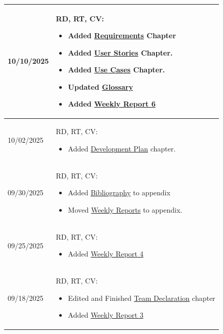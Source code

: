 \begin{longtable}{|l||p{13.5cm}|}
10/10/2025 & RD, RT, CV:
\begin{itemize}[topsep=0pt,itemsep=0pt,parsep=0pt,partopsep=0pt,leftmargin=12pt]
    \item Added \hyperref[Chapter::Requirements]{Requirements} Chapter
    \item Added \hyperref[Chapter::UserStories]{User Stories} Chapter.
    \item Added \hyperref[Chapter::UseCases]{Use Cases} Chapter.
    \item Updated \hyperref[Chapter::Glossary]{Glossary}
    \item Added \hyperref[sec:report6]{Weekly Report 6}
\end{itemize}
\\ \hline

10/02/2025 & RD, RT, CV:
\begin{itemize}[topsep=0pt,itemsep=0pt,parsep=0pt,partopsep=0pt,leftmargin=12pt]
    \item Added \hyperref[Chapter::DevelopmentPlan]{Development Plan} chapter.
\end{itemize}
\\ \hline

09/30/2025 & RD, RT, CV:
\begin{itemize}[topsep=0pt,itemsep=0pt,parsep=0pt,partopsep=0pt,leftmargin=12pt]
    \item Added \hyperref[sec:bibliography]{Bibliography} to appendix
    \item Moved \hyperref[Chapter::WeeklyReports]{Weekly Reports} to appendix.
\end{itemize}
\\ \hline

09/25/2025 & RD, RT, CV:
\begin{itemize}[topsep=0pt,itemsep=0pt,parsep=0pt,partopsep=0pt,leftmargin=12pt]
    \item Added \hyperref[sec:report4]{Weekly Report 4}
\end{itemize}
\\ \hline

09/18/2025 & RD, RT, CV:
\begin{itemize}[topsep=0pt,itemsep=0pt,parsep=0pt,partopsep=0pt,leftmargin=12pt]
    \item Edited and Finished \hyperref[Chapter::TeamDeclaration]{Team Declaration} chapter
    \item Added \hyperref[sec:report3]{Weekly Report 3}
\end{itemize}
\\ \hline


\end{longtable}
